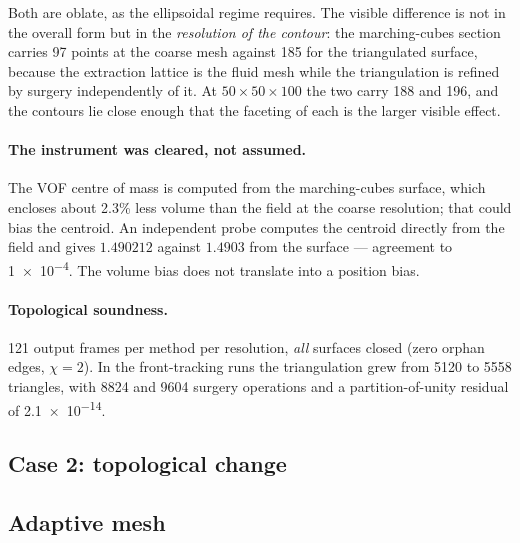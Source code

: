 Both are oblate, as the ellipsoidal regime requires. The visible difference is
not in the overall form but in the \emph{resolution of the contour}: the
marching-cubes section carries 97 points at the coarse mesh against 185 for the
triangulated surface, because the extraction lattice is the fluid mesh while the
triangulation is refined by surgery independently of it. At
$50\times50\times100$ the two carry 188 and 196, and the contours lie close
enough that the faceting of each is the larger visible effect.

\paragraph{The instrument was cleared, not assumed.}
The VOF centre of mass is computed from the marching-cubes surface, which
encloses about 2.3\% less volume than the field at the coarse resolution; that
could bias the centroid. An independent probe computes the centroid directly
from the field and gives $1.490212$ against $1.4903$ from the surface ---
agreement to \num{1e-4}. The volume bias does not translate into a position
bias.

\paragraph{Topological soundness.}
121 output frames per method per resolution, \emph{all} surfaces closed (zero
orphan edges, $\chi = 2$). In the front-tracking runs the triangulation grew from
5120 to 5558 triangles, with 8824 and 9604 surgery operations and a
partition-of-unity residual of \num{2.1e-14}.

\subsection{Case 2: topological change}

\subsection{Adaptive mesh}
